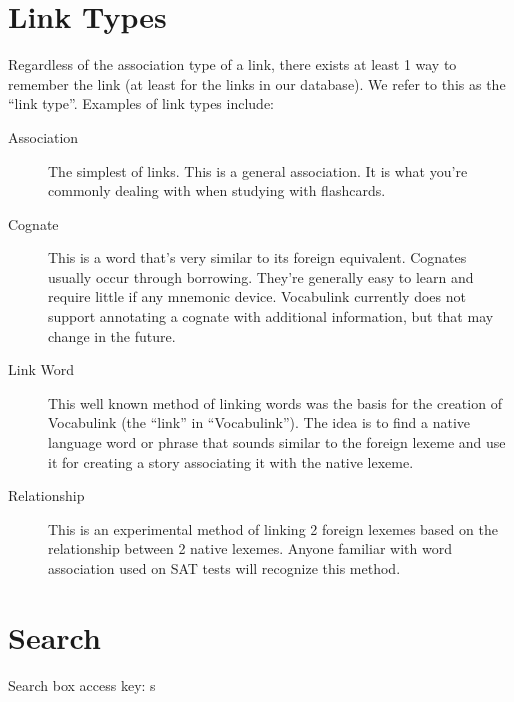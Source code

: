 \section{Link Types}

Regardless of the association type of a link, there exists at least 1 way to
remember the link (at least for the links in our database). We refer to this as
the ``link type''. Examples of link types include:

\begin{description}
\item[Association] The simplest of links. This is a general association. It is
  what you're commonly dealing with when studying with flashcards.
\item[Cognate] This is a word that's very similar to its foreign equivalent.
  Cognates usually occur through borrowing. They're generally easy to learn and
  require little if any mnemonic device. Vocabulink currently does not support
  annotating a cognate with additional information, but that may change in the
  future.
\item[Link Word] This well known method of linking words was the basis for the
  creation of Vocabulink (the ``link'' in ``Vocabulink''). The idea is to find
  a native language word or phrase that sounds similar to the foreign lexeme
  and use it for creating a story associating it with the native lexeme.
\item[Relationship] This is an experimental method of linking 2 foreign lexemes
  based on the relationship between 2 native lexemes. Anyone familiar with word
  association used on SAT tests will recognize this method.
\end{description}

\section{Search}

Search box access key: s